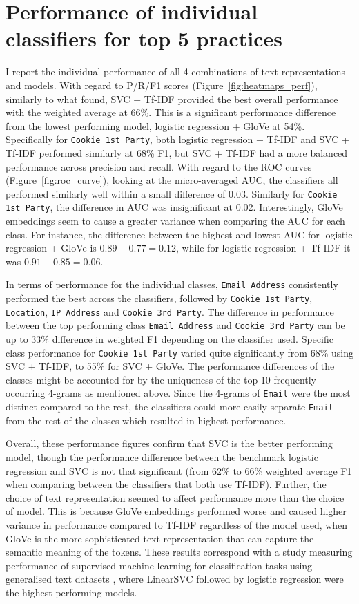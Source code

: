 \section{Performance of individual classifiers for top 5 practices}
\label{sec:perf_top_5}
I report the individual performance of all 4 combinations of text representations and models. With regard to P/R/F1 scores (Figure~\ref{fig:heatmaps_perf}), similarly to what \cite{zimmeck2019} found, SVC + Tf-IDF provided the best overall performance with the weighted average at 66\%. This is a significant performance difference from the lowest performing model, logistic regression + GloVe at 54\%. Specifically for \texttt{Cookie 1st Party}, both logistic regression + Tf-IDF and SVC + Tf-IDF performed similarly at 68\% F1, but SVC + Tf-IDF had a more balanced performance across precision and recall. With regard to the ROC curves (Figure~\ref{fig:roc_curve}), looking at the micro-averaged AUC, the classifiers all performed similarly well within a small difference of 0.03. Similarly for \texttt{Cookie 1st Party}, the difference in AUC was insignificant at 0.02. Interestingly, GloVe embeddings seem to cause a greater variance when comparing the AUC for each class. For instance, the difference between the highest and lowest AUC for logistic regression + GloVe is $0.89 - 0.77 = 0.12$, while for logistic regression + Tf-IDF it was $0.91 - 0.85 = 0.06$.

In terms of performance for the individual classes, \texttt{Email Address} consistently performed the best across the classifiers, followed by \texttt{Cookie 1st Party}, \texttt{Location}, \texttt{IP Address} and \texttt{Cookie 3rd Party}. The difference in performance between the top performing class \texttt{Email Address} and \texttt{Cookie 3rd Party} can be up to 33\% difference in weighted F1 depending on the classifier used. Specific class performance for \texttt{Cookie 1st Party} varied quite significantly from 68\% using SVC + Tf-IDF, to 55\% for SVC + GloVe. The performance differences of the classes might be accounted for by the uniqueness of the top 10 frequently occurring 4-grams as mentioned above. Since the 4-grams of \texttt{Email} were the most distinct compared to the rest, the classifiers could more easily separate \texttt{Email} from the rest of the classes which resulted in highest performance.

Overall, these performance figures confirm that SVC is the better performing model, though the performance difference between the benchmark logistic regression and SVC is not that significant (from 62\% to 66\% weighted average F1 when comparing between the classifiers that both use Tf-IDF). Further, the choice of text representation seemed to affect performance more than the choice of model. This is because GloVe embeddings performed worse and caused higher variance in performance compared to Tf-IDF regardless of the model used, when GloVe is the more sophisticated text representation that can capture the semantic meaning of the tokens. These results correspond with a study measuring performance of supervised machine learning for classification tasks using generalised text datasets \cite{hsu2020}, where LinearSVC followed by logistic regression were the highest performing models. 


